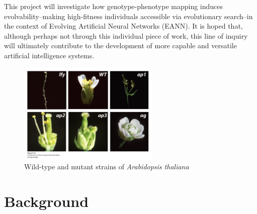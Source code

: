 \documentclass[a4paper]{article}
\begin{document}
This project will investigate how genotype-phenotype mapping induces evolvability--making high-fitness individuals accessible via evolutionary search--in the context of Evolving Artificial Neural Networks (EANN). It is hoped that, although perhaps not through this individual piece of work, this line of inquiry will ultimately contribute to the development of more capable and versatile artificial intelligence systems.

\begin{figure}
\centering
\includegraphics[width=0.6\textwidth]{arabidopsis_mutations.png}
\caption{\label{fig:arabidopsis_mutants}Wild-type and mutant strains of \textit{Arabidopsis thaliana} \cite{Griffiths2015IntroductionAnalysis}} 
\end{figure}

\section{Background}
\end{document}
